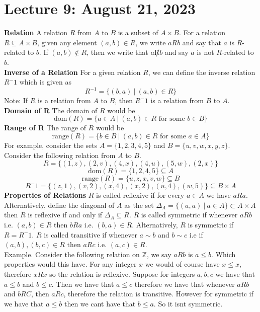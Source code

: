\documentclass{article}
\begin{document}
\section{Lecture 9: August 21, 2023}
\textbf{Relation} A relation \(R\) from \(A\) to \(B\) is a subset of \(A \times B\). For a relation \(R \subseteq A \times B\), given any element \((a,b) \in R\), we write \(aRb\) and say that \(a\) is \(R\)-related to \(b\). If \((a,b) \notin R\), then we write that $a\not R b$ and say \(a\) is not \(R\)-related to \(b\).\\
\textbf{Inverse of a Relation} For a given relation \(R\), we can define the inverse relation \(R^-1\) which is given as 
\[R^{-1} = \{(b,a)\ \vert\ (a,b) \in R\}\]
Note: If \(R\) is a relation from \(A\) to \(B\), then \(R^-1\) is a relation from \(B\) to \(A\).\\
\textbf{Domain of R} The domain of \(R\) would be 
\[\mathrm{dom}(R) = \{a\in A\ \vert\ (a,b) \in R\text{ for some }b\in B\}\]
\textbf{Range of R} The range of \(R\) would be 
\[\mathrm{range}(R) = \{b\in B\ \vert\ (a,b) \in R\text{ for some }a\in A\}\]
For example, consider the sets 
\(A = \{1,2,3,4,5\}\) and 
\(B =\{u,v,w,x,y,z\}\).
Consider the following relation from \(A\) to \(B\).
\[R =\{(1,z),(2,v),(4,x),(4,u),(5,w),(2,x)\}\]
\[\text{dom}(R) = \{1,2,4,5\} \subseteq A\]
\[\text{range}(R) = \{u,z,x,v,w\} \subseteq B\]
\[R^-1 = \{(z,1),(v,2),(x,4),(x,2),(u,4),(w,5)\} \subseteq B \times A\]
\textbf{Properties of Relations} \(R\) is called reflexive if for every \(a \in A\) we have \(aRa\). Alternatively, define the diagonal of \(A\) as the set $\Delta_A = \{(a,a)\ \vert\ a\in A\} \subset A \times A$ then \(R\) is reflexive if and only if $\Delta_A \subseteq R$. \(R\) is called symmetric if whenever \(aRb\) i.e. \((a,b) \in R\) then \(bRa\) i.e. \((b,a) \in R\). Alternatively, \(R\) is symmetric if \(R = R^-1\). \(R\) is called transitive if whenever \(a \sim b\) and \(b \sim c\) i.e if \((a,b),(b,c) \in R\) then \(aRc\) i.e. \((a,c) \in R\).\\
Example. Consider the following relation on \(\mathbb{Z}\), we say \(aRb\) is \(a \leq b\). Which properties would this have. For any integer \(x\) we would of course have \(x \leq x\), therefore \(xRx\) so the relation is reflexive. Suppose for integers \(a,b,c\) we have that \(a \leq b\) and \(b \leq c\). Then we have that \(a \leq c\) therefore we have that whenever \(aRb\) and \(bRC\), then \(aRc\), therefore the relation is transitive. However for symmetric if we have that \(a \leq b\) then we cant have that \(b \leq a\). So it isnt symmetric.
\end{document}
